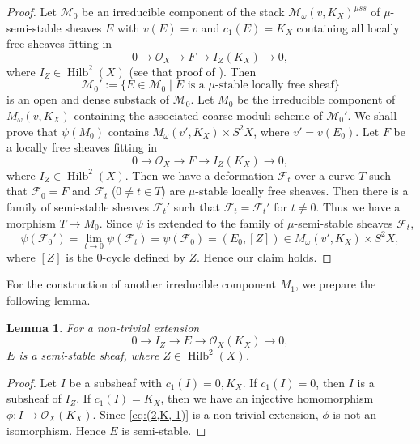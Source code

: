 \documentclass[leqno,11pt]{amsart}
\def\Hilb{\mathop{\mathrm{Hilb}}\nolimits}
\newtheorem{Lem}[Thm]{Lemma}
\theoremstyle{definition}
\def\FF{\ensuremath{\mathcal F}}
\def\MM{\ensuremath{\mathcal M}}
\def\OO{\ensuremath{\mathcal O}}
\begin{document}
\begin{proof}
Let $\MM_0$ be an irreducible component of the stack $\MM_\omega(v,K_X)^{\mu ss}$
of $\mu$-semi-stable sheaves $E$ with $v(E)=v$ and $c_1(E)=K_X$ 
containing all locally free sheaves fitting in
\begin{equation}
0 \to \OO_X \to F \to I_Z (K_X) \to 0,
\end{equation}
where $I_Z \in \Hilb^2(X)$ (see that proof of \cite[Lem. 2.8]{Yos16a}).
Then  
$$
\MM_0':=\{ E \in \MM_0 \mid \text{$E$ is a $\mu$-stable locally free sheaf}\}
$$
is an open and dense substack of $\MM_0$.
Let $M_0$ be the irreducible component of $M_\omega(v,K_X)$
containing the associated coarse moduli scheme of $\MM_0'$.
We shall prove that $\psi(M_0)$ contains $M_\omega(v',K_X) \times S^2 X$,
where $v'=v(E_0)$.
Let $F$ be a locally free sheaves fitting in
\begin{equation}
0 \to \OO_X \to F \to I_Z (K_X) \to 0,
\end{equation}
where $I_Z \in \Hilb^2(X)$.
Then we have a deformation $\FF_t$ over a curve $T$ such that $\FF_0=F$ and
$\FF_t$ ($0 \ne t \in T$) are $\mu$-stable locally free sheaves.
Then there is a family of semi-stable sheaves
$\FF_t'$ such that $\FF_t=\FF_t'$ for $t \ne 0$.
Thus we have a morphism $T \to M_0$.
Since $\psi$ is extended to the family of $\mu$-semi-stable sheaves
$\FF_t$, 
\begin{equation}
\psi(\FF_0')=\lim_{t \to 0} \psi(\FF_t)=\psi(\FF_0)=
(E_0, [Z]) \in M_\omega(v',K_X) \times S^2 X,
\end{equation}
where 
$[Z]$ is the 0-cycle defined by $Z$.
Hence our claim holds.
\end{proof}




For the construction of another irreducible component $M_1$,
we prepare the following lemma.
\begin{Lem}
For a non-trivial extension
\begin{equation}\label{eq:(2,K,-1)}
0 \to I_Z \to E \to \OO_X(K_X) \to 0,
\end{equation}
$E$ is a semi-stable sheaf, where
$Z \in \Hilb^2(X)$.
\end{Lem}

\begin{proof}
Let $I$ be a subsheaf with $c_1(I)=0,K_X$.
If $c_1(I)=0$, then $I$ is a subsheaf of $I_Z$.
If $c_1(I)=K_X$, then we have an injective homomorphism
$\phi:I \to \OO_X(K_X)$.
Since \eqref{eq:(2,K,-1)} is a non-trivial extension,
$\phi$ is not an isomorphism.
Hence $E$ is semi-stable. 
\end{proof}
\end{document}
